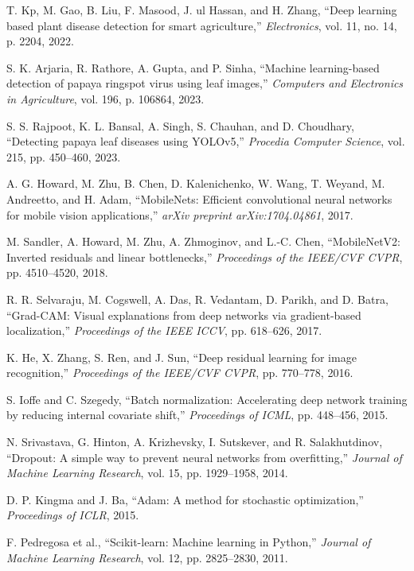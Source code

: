 \documentclass[12pt,a4paper]{report}
\begin{document}
\begin{enumerate}[label={[\arabic*]}]
    \item T. Kp, M. Gao, B. Liu, F. Masood, J. ul Hassan, and H. Zhang, ``Deep learning based plant disease detection for smart agriculture,'' \textit{Electronics}, vol. 11, no. 14, p. 2204, 2022.

    \item S. K. Arjaria, R. Rathore, A. Gupta, and P. Sinha, ``Machine learning-based detection of papaya ringspot virus using leaf images,'' \textit{Computers and Electronics in Agriculture}, vol. 196, p. 106864, 2023.

    \item S. S. Rajpoot, K. L. Bansal, A. Singh, S. Chauhan, and D. Choudhary, ``Detecting papaya leaf diseases using YOLOv5,'' \textit{Procedia Computer Science}, vol. 215, pp. 450--460, 2023.

    \item A. G. Howard, M. Zhu, B. Chen, D. Kalenichenko, W. Wang, T. Weyand, M. Andreetto, and H. Adam, ``MobileNets: Efficient convolutional neural networks for mobile vision applications,'' \textit{arXiv preprint arXiv:1704.04861}, 2017.

    \item M. Sandler, A. Howard, M. Zhu, A. Zhmoginov, and L.-C. Chen, ``MobileNetV2: Inverted residuals and linear bottlenecks,'' \textit{Proceedings of the IEEE/CVF CVPR}, pp. 4510--4520, 2018.

    \item R. R. Selvaraju, M. Cogswell, A. Das, R. Vedantam, D. Parikh, and D. Batra, ``Grad-CAM: Visual explanations from deep networks via gradient-based localization,'' \textit{Proceedings of the IEEE ICCV}, pp. 618--626, 2017.

    \item K. He, X. Zhang, S. Ren, and J. Sun, ``Deep residual learning for image recognition,'' \textit{Proceedings of the IEEE/CVF CVPR}, pp. 770--778, 2016.

    \item S. Ioffe and C. Szegedy, ``Batch normalization: Accelerating deep network training by reducing internal covariate shift,'' \textit{Proceedings of ICML}, pp. 448--456, 2015.

    \item N. Srivastava, G. Hinton, A. Krizhevsky, I. Sutskever, and R. Salakhutdinov, ``Dropout: A simple way to prevent neural networks from overfitting,'' \textit{Journal of Machine Learning Research}, vol. 15, pp. 1929--1958, 2014.

    \item D. P. Kingma and J. Ba, ``Adam: A method for stochastic optimization,'' \textit{Proceedings of ICLR}, 2015.

    \item F. Pedregosa et al., ``Scikit-learn: Machine learning in Python,'' \textit{Journal of Machine Learning Research}, vol. 12, pp. 2825--2830, 2011.

\end{enumerate}
\end{document}
